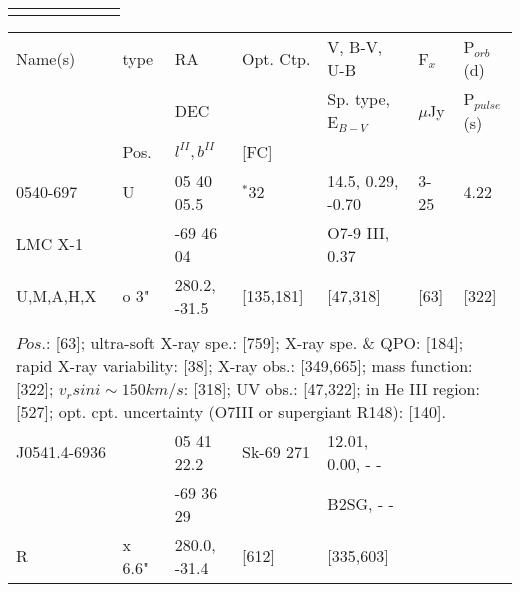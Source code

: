 \documentclass{aa}
\begin{document}
\begin{table*}[h]
\begin{tabular}{p{2.5cm}p{1cm}p{1.8cm}p{2.3cm}p{3.3cm}p{2.0cm}p{2.2cm}}
\noalign{\smallskip}
\hline
\end{tabular}
\end{table*}

\clearpage\begin{table*}[h]
\begin{tabular}{p{2.5cm}p{1cm}p{1.8cm}p{2.3cm}p{3.3cm}p{2.0cm}p{2.2cm}}
\noalign{\smallskip}
\multicolumn{7}{p{17.5cm}}{Table 1.  (continued) }\\        
\hline
\noalign{\smallskip}
Name(s)      & type  & RA                       &  Opt. Ctp. & V, B-V, U-B                    &   F$_{x}$           & P$_{orb}$(d)    \\
                      &            &  DEC                   &                     &  Sp. type, E$_{B-V}$  &    $\mu$Jy        & P$_{pulse}$(s) \\
                      & Pos.  &  $l^{II}, b^{II}$     &  [FC]           &                                          &                            &                             \\
\noalign{\smallskip} 

\hline
\noalign{\smallskip}
 0540-697     &  U      & 05 40 05.5        & $^*$32              & 14.5, 0.29, -0.70  &  3-25           &     4.22      \\
 LMC X-1      &           & -69 46 04          &                           & O7-9 III, 0.37       &                     &                   \\
U,M,A,H,X    &  o 3" & 280.2, -31.5      &  [135,181]        &    [47,318]             &        [63]      &  [322]       \\
\\
\multicolumn{7}{p{17.5cm}}{
$Pos$.: [63]; ultra-soft X-ray spe.: [759]; X-ray spe. \& QPO: [184]; rapid X-ray variability: [38]; X-ray 
obs.: [349,665]; mass function: [322]; $v_rsin i \sim 150 km/s$: [318]; UV obs.: [47,322]; in He III region: [527]; 
opt. cpt. uncertainty (O7III or supergiant R148): [140].}\\

\noalign{\smallskip}
\hline
\noalign{\smallskip}
J0541.4-6936   &             &  05 41 22.2   & Sk-69 271      & 12.01, 0.00, - -   &  &  \\
                            &             & -69 36 29      &                         &  B2SG, - -            &   &     \\                                 
   R                      & x 6.6"  & 280.0, -31.4  &  [612]               &   [335,603]                    &    &   \\  
  

\end{tabular}
\end{table*}
\end{document}
